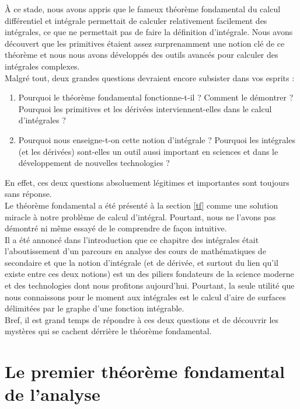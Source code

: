 \documentclass[a4paper,fontsize=13pt]{scrreprt}
\theoremstyle{plain}
\theoremstyle{definition}
\begin{document}
\`A ce stade, nous avons appris que le fameux théorème fondamental du calcul différentiel et intégrale permettait de calculer relativement facilement des intégrales, ce que ne permettait pas de faire la définition d'intégrale. Nous avons découvert que les primitives étaient assez surprenamment une notion clé de ce théorème et nous nous avons développés des outils avancés pour calculer des intégrales complexes. \\
Malgré tout, deux grandes questions devraient encore subsister dans vos esprits :
\begin{large}
\begin{enumerate}
\item Pourquoi le théorème fondamental fonctionne-t-il ? Comment le démontrer ? Pourquoi les primitives et les dérivées interviennent-elles dans le calcul d'intégrales ?
\item Pourquoi nous enseigne-t-on cette notion d'intégrale ? Pourquoi les intégrales (et les dérivées) sont-elles un outil aussi important en sciences et dans le développement de nouvelles technologies ?
\end{enumerate}
\end{large}
En effet, ces deux questions absoluement légitimes et importantes sont toujours sans réponse. \\
Le théorème fondamental a été présenté à la section \ref{tf} comme une solution miracle à notre problème de calcul d'intégral. Pourtant, nous ne l'avons pas démontré ni même essayé de le comprendre de façon intuitive. \\
Il a été annoncé dans l'introduction que ce chapitre des intégrales était l'aboutissement d'un parcours en analyse des cours de mathématiques de secondaire et que la notion d'intégrale (et de dérivée, et surtout du lien qu'il existe entre ces deux notions) est un des piliers fondateurs de la science moderne et des technologies dont nous profitons aujourd'hui. Pourtant, la seule utilité que nous connaissons pour le moment aux intégrales est le calcul d'aire de surfaces délimitées par le graphe d'une fonction intégrable. \\
Bref, il est grand temps de répondre à ces deux questions et de découvrir les mystères qui se cachent dérrière le théorème fondamental.

\section{Le premier théorème fondamental de l'analyse}
\end{document}
